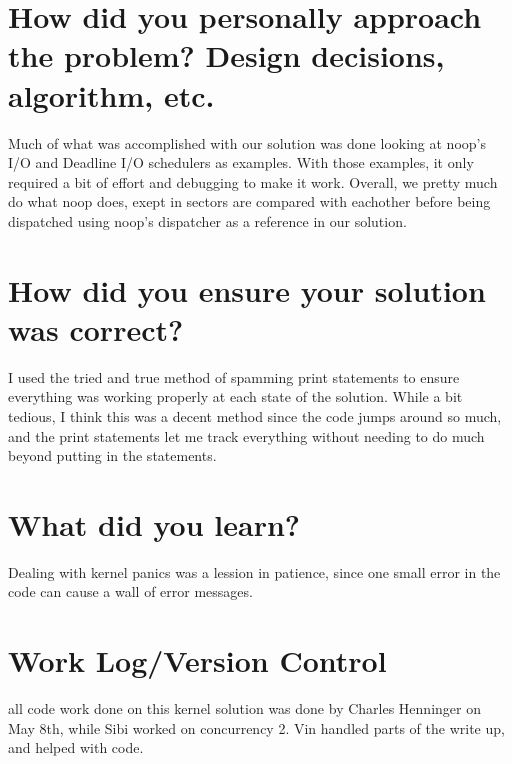 \documentclass[letterpaper, 10pt,titlepage]{article}
\newcommand\tab[1][1cm]{\hspace*{#1}}
\begin{document}
\section{How did you personally approach the problem? Design decisions, algorithm, etc.}
\tab Much of what was accomplished with our solution was done looking at noop's I/O and Deadline I/O schedulers as examples. With those examples, it only required a bit of effort and debugging to make it work. Overall, we pretty much do what noop does, exept in sectors are compared with eachother before being dispatched using noop's dispatcher as a reference in our solution.

\section{How did you ensure your solution was correct?}
\tab I used the tried and true method of spamming print statements to ensure everything was working properly at each state of the solution. While a bit tedious, I think this was a decent method since the code jumps around so much, and the print statements let me track everything without needing to do much beyond putting in the statements.

\section{What did you learn?}
\tab Dealing with kernel panics was a lession in patience, since one small error in the code can cause a wall of error messages.  

\section{Work Log/Version Control}
\tab all code work done on this kernel solution was done by Charles Henninger on May 8th, while Sibi worked on concurrency 2. Vin handled parts of the write up, and helped with code.
\end{document}
